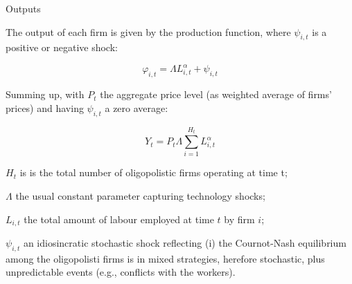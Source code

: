 \documentclass[9pt]{beamer}
\begin{document}
\begin{frame}{Outputs}

The output of each firm is given by the production function, where $\psi _{i,t}$ is a positive or negative shock:

\begin{equation}
\varphi _{i,t}=\Lambda L_{i,t}^{\alpha }+\psi _{i,t}
\end{equation}

Summing up, with $P_t$ the aggregate price level (as weighted average of firms' prices) and having $\psi _{i,t}$ a zero average:

\begin{equation}
Y_{t}=P_{t}\Lambda \overset{H_{t}}{\underset{i=1}{\sum }}L_{i,t}^{\alpha}
\end{equation}

\smallskip
\small
$H_{t}$ is is the total number of oligopolistic firms operating at time t;

$\Lambda$ the usual constant parameter capturing technology shocks;

$L_{i,t}$ the total amount of labour employed at time $t$ by firm $i$;

$\psi _{i,t}$ an idiosincratic stochastic shock reflecting (i) the Cournot-Nash equilibrium among the oligopolisti firms is in mixed strategies, herefore stochastic, plus unpredictable events (e.g., conflicts with the workers).

\end{frame}
\end{document}

